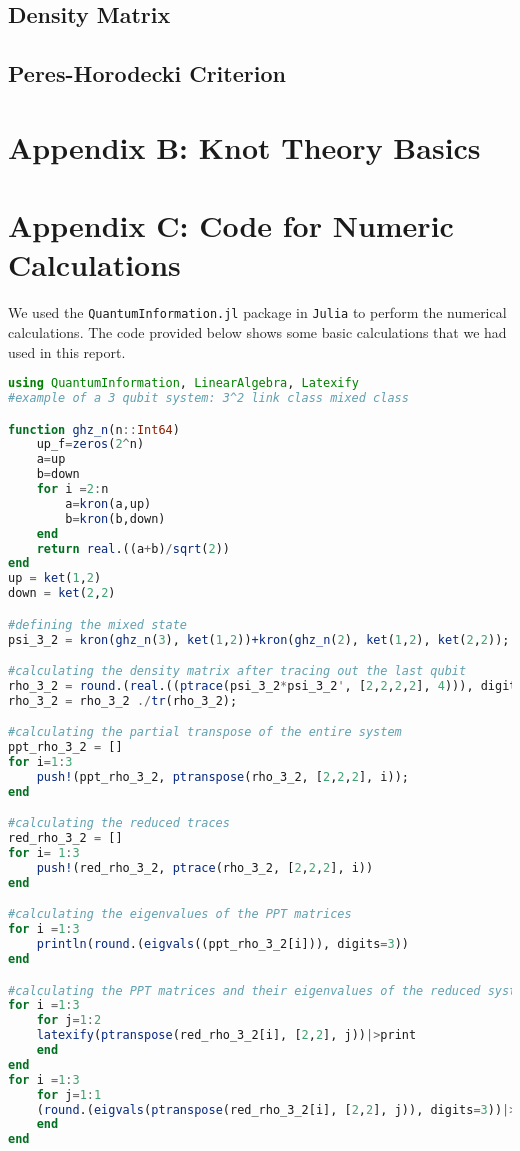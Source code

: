 \documentclass{scrartcl}
\begin{document}
\subsection{Density Matrix}
\subsection{Peres-Horodecki Criterion}
\newpage
\section*{Appendix B: {\huge Knot Theory Basics}}
\newpage

\section*{Appendix C: {\huge Code for Numeric Calculations}}
We used the \texttt{QuantumInformation.jl} package in \texttt{Julia} to perform the numerical calculations. The code provided below shows some basic calculations that we had used in this report. 
\begin{lstlisting}[language=Julia,label={lst:transmission}]
using QuantumInformation, LinearAlgebra, Latexify 
#example of a 3 qubit system: 3^2 link class mixed class

function ghz_n(n::Int64)
    up_f=zeros(2^n)
    a=up
    b=down
    for i =2:n 
        a=kron(a,up)
        b=kron(b,down)
    end
    return real.((a+b)/sqrt(2))
end
up = ket(1,2)
down = ket(2,2)

#defining the mixed state 
psi_3_2 = kron(ghz_n(3), ket(1,2))+kron(ghz_n(2), ket(1,2), ket(2,2));

#calculating the density matrix after tracing out the last qubit
rho_3_2 = round.(real.((ptrace(psi_3_2*psi_3_2', [2,2,2,2], 4))), digits=3) 
rho_3_2 = rho_3_2 ./tr(rho_3_2);

#calculating the partial transpose of the entire system
ppt_rho_3_2 = []
for i=1:3
    push!(ppt_rho_3_2, ptranspose(rho_3_2, [2,2,2], i));
end

#calculating the reduced traces 
red_rho_3_2 = []
for i= 1:3
    push!(red_rho_3_2, ptrace(rho_3_2, [2,2,2], i))
end

#calculating the eigenvalues of the PPT matrices
for i =1:3
    println(round.(eigvals((ppt_rho_3_2[i])), digits=3))
end

#calculating the PPT matrices and their eigenvalues of the reduced system
for i =1:3
    for j=1:2
    latexify(ptranspose(red_rho_3_2[i], [2,2], j))|>print
    end
end
for i =1:3
    for j=1:1
    (round.(eigvals(ptranspose(red_rho_3_2[i], [2,2], j)), digits=3))|>println
    end
end
\end{lstlisting}

\newpage

\end{document}
